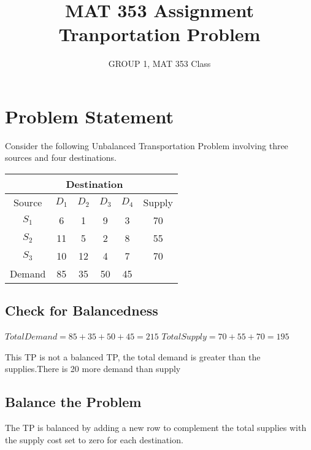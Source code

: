 \documentclass{article}
\title{\textbf{MAT 353 Assignment} \\ Tranportation Problem}
\author{GROUP 1, MAT 353 Class}
\date{
	Novermber 25, 2022\endgraf\endgraf
	\vspace{200px}
	\section*{Question}
	Sovle an unbalanced Transportation Problem using the:
	\begin{itemize}
		 \item \quad Northwest Corner Method
  		 \item \quad Least Cost First Method
  		 \item \quad Vogel's Method
	\end{itemize}
}
\begin{document}
	\maketitle
	\newpage


	\pagestyle{fancy}
	\fancyhead{}

	\section*{Problem Statement}
	Consider the following Unbalanced Transportation Problem involving three sources and four destinations.

	\begin{center}
		\begin{tabular}{ |c|c c c c|c| }
			\hline
			& \multicolumn{4}{|c|}{Destination} & \\
			\hline
			Source & $D_{1}$ & $D_{2}$ & $D_{3}$ & $D_{4}$ & Supply \\
			\hline
			$S_{1}$ & 6 & 1 & 9 & 3 & 70 \\
			$S_{2}$ & 11 & 5 & 2 & 8 & 55 \\
			$S_{3}$ & 10 & 12 & 4 & 7 & 70 \\
			\hline
			Demand & 85 & 35 & 50 & 45 & \\
			\hline
		\end{tabular}
	\end{center}

	\subsection{Check for Balancedness}
		\qquad $Total Demand = 85 + 35 + 50 + 45 = 215$
		\qquad $Total Supply = 70 + 55 + 70 = 195$\newline

		This TP is not a balanced TP, the total demand is greater than the supplies.There is 20 more demand than supply

	\subsection{Balance the Problem}
		\qquad The TP is balanced by adding a new row to complement the total supplies with the supply cost set to zero for each destination.
\end{document}
